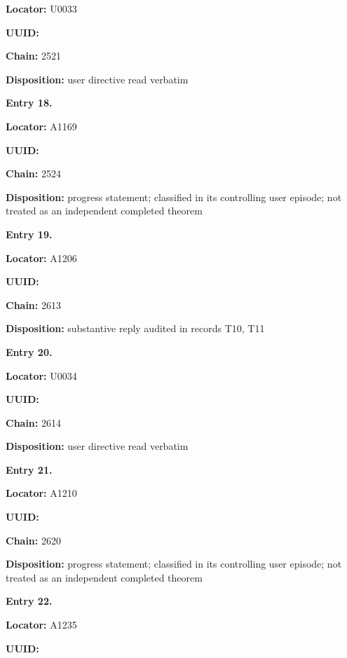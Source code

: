 \documentclass[10pt,a4paper,oneside]{report}
\begin{document}
\textbf{Locator:} U0033

\textbf{UUID:} \protect{}

\textbf{Chain:} 2521

\textbf{Disposition:} user directive read verbatim


\textbf{Entry 18.}

\textbf{Locator:} A1169

\textbf{UUID:} \protect{}

\textbf{Chain:} 2524

\textbf{Disposition:} progress statement; classified in its controlling
user episode; not treated as an independent completed theorem


\textbf{Entry 19.}

\textbf{Locator:} A1206

\textbf{UUID:} \protect{}

\textbf{Chain:} 2613

\textbf{Disposition:} substantive reply audited in records T10, T11


\textbf{Entry 20.}

\textbf{Locator:} U0034

\textbf{UUID:} \protect{}

\textbf{Chain:} 2614

\textbf{Disposition:} user directive read verbatim


\textbf{Entry 21.}

\textbf{Locator:} A1210

\textbf{UUID:} \protect{}

\textbf{Chain:} 2620

\textbf{Disposition:} progress statement; classified in its controlling
user episode; not treated as an independent completed theorem


\textbf{Entry 22.}

\textbf{Locator:} A1235

\textbf{UUID:} \protect{}
\end{document}

